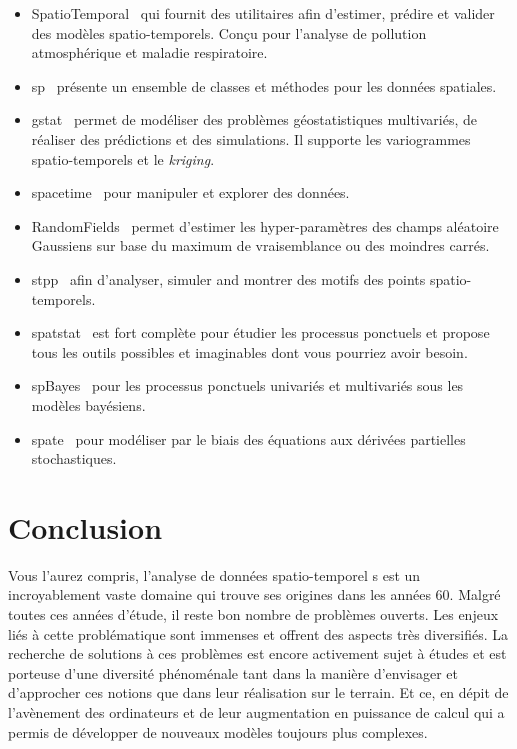\begin{itemize}
    \item SpatioTemporal~\cite{keller2015unified} qui fournit des utilitaires afin d'estimer, prédire et valider des modèles spatio-temporels. Conçu pour l'analyse de pollution atmosphérique et maladie respiratoire.
    \item sp~\cite{sppackage} présente un ensemble de classes et méthodes pour les données spatiales.
    \item gstat~\cite{pebesma2004multivariable} permet de modéliser des problèmes géostatistiques multivariés, de réaliser des prédictions et des simulations. Il supporte les variogrammes spatio-temporels et le \textit{kriging}.
    \item spacetime~\cite{pebesma2012spacetime} pour manipuler et explorer des données.
    \item RandomFields~\cite{schlather2015analysis} permet d'estimer les hyper-paramètres des champs aléatoire Gaussiens sur base du maximum de vraisemblance ou des moindres carrés.
    \item stpp~\cite{gabriel2013stpp} afin d'analyser, simuler and montrer des motifs des points spatio-temporels.
    \item spatstat~\cite{baddeley2016spatial} est fort complète pour étudier les processus ponctuels et propose tous les outils possibles et imaginables dont vous pourriez avoir besoin.
    \item spBayes~\cite{finley2007spbayes} pour les processus ponctuels univariés et multivariés sous les modèles bayésiens.
    \item spate~\cite{sigrist2015spate} pour modéliser par le biais des équations aux dérivées partielles stochastiques.
\end{itemize}



\section{Conclusion}

Vous l'aurez compris, l'analyse de données spatio-temporel
s est un incroyablement vaste domaine qui trouve ses origines dans les années 60. Malgré toutes ces années d'étude, il reste bon nombre de problèmes ouverts. Les enjeux liés à cette problématique sont immenses et offrent des aspects très diversifiés. La recherche de solutions à ces problèmes est encore activement sujet à études et est porteuse d'une diversité phénoménale tant dans la manière d'envisager et d'approcher ces notions que dans leur réalisation sur le terrain. Et ce, en dépit de l'avènement des ordinateurs et de leur augmentation en puissance de calcul qui a permis de développer de nouveaux modèles toujours plus complexes.

